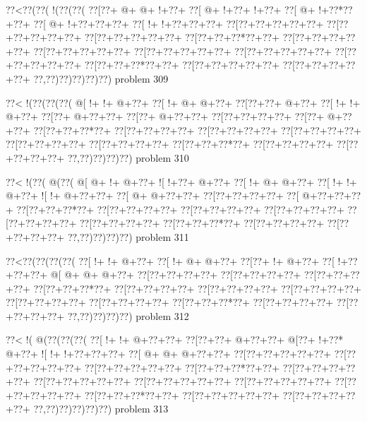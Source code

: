 \vbox{\vbox{\goo
\0??<\0??(\0??(\- !(\0??(\0??(
\0??[\0??+\- @+\- @+\- !+\0??+
\0??[\- @+\- !+\0??+\- !+\0??+
\0??[\- @+\- !+\0??*\0??+\0??+
\0??[\- @+\- !+\0??+\0??+\0??+
\0??[\- !+\- !+\0??+\0??+\0??+
\0??[\0??+\0??+\0??+\0??+\0??+
\0??[\0??+\0??+\0??+\0??+\0??+
\0??[\0??+\0??+\0??+\0??+\0??+
\0??[\0??+\0??+\0??*\0??+\0??+
\0??[\0??+\0??+\0??+\0??+\0??+
\0??[\0??+\0??+\0??+\0??+\0??+
\0??[\0??+\0??+\0??+\0??+\0??+
\0??[\0??+\0??+\0??+\0??+\0??+
\0??[\0??+\0??+\0??+\0??+\0??+
\0??[\0??+\0??+\0??*\0??+\0??+
\0??[\0??+\0??+\0??+\0??+\0??+
\0??[\0??+\0??+\0??+\0??+\0??+
\0??,\0??)\0??)\0??)\0??)\0??)
}
\hfil problem 309\hfil\break
}

\vbox{\vbox{\goo
\0??<\- !(\0??(\0??(\0??(
\- @[\- !+\- !+\- @+\0??+
\0??[\- !+\- @+\- @+\0??+
\0??[\0??+\0??+\- @+\0??+
\0??[\- !+\- !+\- @+\0??+
\0??[\0??+\- @+\0??+\0??+
\0??[\0??+\- @+\0??+\0??+
\0??[\0??+\0??+\0??+\0??+
\0??[\0??+\- @+\0??+\0??+
\0??[\0??+\0??+\0??*\0??+
\0??[\0??+\0??+\0??+\0??+
\0??[\0??+\0??+\0??+\0??+
\0??[\0??+\0??+\0??+\0??+
\0??[\0??+\0??+\0??+\0??+
\0??[\0??+\0??+\0??+\0??+
\0??[\0??+\0??+\0??*\0??+
\0??[\0??+\0??+\0??+\0??+
\0??[\0??+\0??+\0??+\0??+
\0??,\0??)\0??)\0??)\0??)
}
\hfil problem 310\hfil\break
}

\vbox{\vbox{\goo
\0??<\- !(\0??(\- @(\0??(
\- @[\- @+\- !+\- @+\0??+
\- ![\- !+\0??+\- @+\0??+
\0??[\- !+\- @+\- @+\0??+
\0??[\- !+\- !+\- @+\0??+
\- ![\- !+\- @+\0??+\0??+
\0??[\- @+\- @+\0??+\0??+
\0??[\0??+\0??+\0??+\0??+
\0??[\- @+\0??+\0??+\0??+
\0??[\0??+\0??+\0??*\0??+
\0??[\0??+\0??+\0??+\0??+
\0??[\0??+\0??+\0??+\0??+
\0??[\0??+\0??+\0??+\0??+
\0??[\0??+\0??+\0??+\0??+
\0??[\0??+\0??+\0??+\0??+
\0??[\0??+\0??+\0??*\0??+
\0??[\0??+\0??+\0??+\0??+
\0??[\0??+\0??+\0??+\0??+
\0??,\0??)\0??)\0??)\0??)
}
\hfil problem 311\hfil\break
}

\vbox{\vbox{\goo
\0??<\0??(\0??(\0??(\0??(
\0??[\- !+\- !+\- @+\0??+
\0??[\- !+\- @+\- @+\0??+
\0??[\0??+\- !+\- @+\0??+
\0??[\- !+\0??+\0??+\0??+
\- @[\- @+\- @+\- @+\0??+
\0??[\0??+\0??+\0??+\0??+
\0??[\0??+\0??+\0??+\0??+
\0??[\0??+\0??+\0??+\0??+
\0??[\0??+\0??+\0??*\0??+
\0??[\0??+\0??+\0??+\0??+
\0??[\0??+\0??+\0??+\0??+
\0??[\0??+\0??+\0??+\0??+
\0??[\0??+\0??+\0??+\0??+
\0??[\0??+\0??+\0??+\0??+
\0??[\0??+\0??+\0??*\0??+
\0??[\0??+\0??+\0??+\0??+
\0??[\0??+\0??+\0??+\0??+
\0??,\0??)\0??)\0??)\0??)
}
\hfil problem 312\hfil\break
}

\vbox{\vbox{\goo
\0??<\- !(\- @(\0??(\0??(\0??(
\0??[\- !+\- !+\- @+\0??+\0??+
\0??[\0??+\0??+\- @+\0??+\0??+
\- @[\0??+\- !+\0??*\- @+\0??+
\- ![\- !+\- !+\0??+\0??+\0??+
\0??[\- @+\- @+\- @+\0??+\0??+
\0??[\0??+\0??+\0??+\0??+\0??+
\0??[\0??+\0??+\0??+\0??+\0??+
\0??[\0??+\0??+\0??+\0??+\0??+
\0??[\0??+\0??+\0??*\0??+\0??+
\0??[\0??+\0??+\0??+\0??+\0??+
\0??[\0??+\0??+\0??+\0??+\0??+
\0??[\0??+\0??+\0??+\0??+\0??+
\0??[\0??+\0??+\0??+\0??+\0??+
\0??[\0??+\0??+\0??+\0??+\0??+
\0??[\0??+\0??+\0??*\0??+\0??+
\0??[\0??+\0??+\0??+\0??+\0??+
\0??[\0??+\0??+\0??+\0??+\0??+
\0??,\0??)\0??)\0??)\0??)\0??)
}
\hfil problem 313\hfil\break
}

